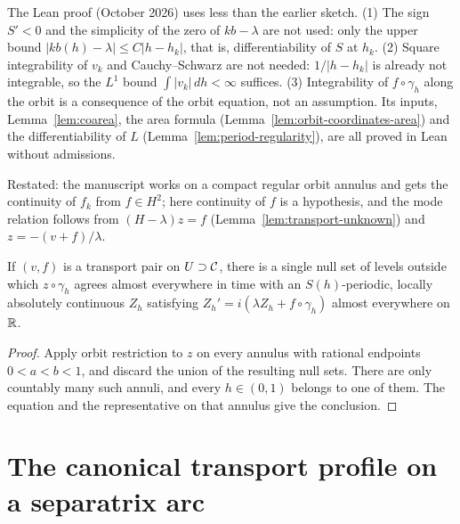 \begin{remark}
The Lean proof (October 2026) uses less than the earlier sketch. (1) The sign $S'<0$ and
the simplicity of the zero of $kb-\lambda$ are not used: only the upper bound
$|kb(h)-\lambda|\le C|h-h_k|$, that is, differentiability of $S$ at $h_k$. (2) Square
integrability of $v_k$ and Cauchy--Schwarz are not needed: $1/|h-h_k|$ is already not
integrable, so the $L^1$ bound $\int|v_k|\,dh<\infty$ suffices. (3) Integrability of
$f\circ\gamma_h$ along the orbit is a consequence of the orbit equation, not an
assumption. Its inputs, Lemma~\ref{lem:coarea}, the area formula
(Lemma~\ref{lem:orbit-coordinates-area}) and the differentiability of $L$
(Lemma~\ref{lem:period-regularity}), are all proved in Lean without admissions.
\end{remark}

\begin{remark}
Restated: the manuscript works on a compact regular orbit annulus and gets the
continuity of $f_k$ from $f\in H^2$; here continuity of $f$ is a hypothesis, and the mode
relation follows from $(H-\lambda)z=f$ (Lemma~\ref{lem:transport-unknown}) and
$z=-(v+f)/\lambda$.
\end{remark}

\begin{lemma}
\label{lem:cell-orbit-transport}
\leanok
If $(v,f)$ is a transport pair on $U\supset\mathcal{C}$, there is a single null set
of levels outside which $z\circ\gamma_h$ agrees almost everywhere in time
with an $S(h)$-periodic, locally absolutely continuous $Z_h$ satisfying
$Z_h'=i(\lambda Z_h+f\circ\gamma_h)$ almost everywhere on $\mathbb{R}$.
\end{lemma}

\begin{proof}
\leanok
Apply orbit restriction to $z$ on every annulus with rational endpoints
$0<a<b<1$, and discard the union of the resulting null sets. There are only
countably many such annuli, and every $h\in(0,1)$ belongs to one of them.
The equation and the representative on that annulus give the conclusion.
\end{proof}

\section{The canonical transport profile on a separatrix arc}

